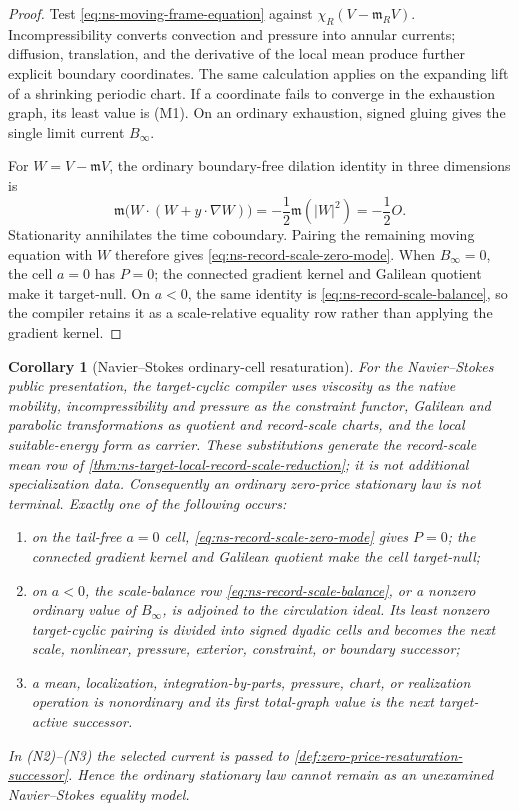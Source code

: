 \documentclass[11pt]{article}
\numberwithin{section}{part}
\theoremstyle{plain}
\newtheorem{corollary}[corollary]{Corollary}
\theoremstyle{definition}
\theoremstyle{remark}
\begin{document}
\begin{proof}
Test \eqref{eq:ns-moving-frame-equation} against
\(\chi_R(V-\mathfrak m_RV)\).  Incompressibility converts convection and
pressure into annular currents; diffusion, translation, and the derivative
of the local mean produce further explicit boundary coordinates.  The same
calculation applies on the expanding lift of a shrinking periodic chart.
If a coordinate fails to converge in the exhaustion graph, its least value
is \textup{(M1)}.  On an ordinary exhaustion, signed gluing gives the single
limit current \(B_\infty\).

For \(W=V-\mathfrak mV\), the ordinary boundary-free dilation identity in
three dimensions is
\[
 \mathfrak m\bigl(W\cdot( W+y\cdot\nabla W)\bigr)
 =-\frac12\mathfrak m(|W|^2)=-\frac12O.
\]
Stationarity annihilates the time coboundary.  Pairing the remaining moving
equation with \(W\) therefore gives
\eqref{eq:ns-record-scale-zero-mode}.  When \(B_\infty=0\), the cell \(a=0\)
has \(P=0\); the connected gradient kernel and Galilean quotient make it
target-null.  On \(a<0\), the same identity is
\eqref{eq:ns-record-scale-balance}, so the compiler retains it as a
scale-relative equality row rather than applying the gradient kernel.
\end{proof}

\begin{corollary}[Navier--Stokes ordinary-cell resaturation]
\label{cor:ns-ordinary-cell-resaturation}
For the Navier--Stokes public presentation, the target-cyclic compiler uses
viscosity as the native mobility, incompressibility and pressure as the
constraint functor, Galilean and parabolic transformations as quotient and
record-scale charts, and the local suitable-energy form as carrier.  These
substitutions generate the record-scale mean row of
\cref{thm:ns-target-local-record-scale-reduction}; it is not additional
specialization data.  Consequently an ordinary zero-price stationary law is
not terminal.  Exactly one of the following occurs:
\begin{enumerate}[label=\textup{(N\arabic*)}]
\item on the tail-free \(a=0\) cell, \eqref{eq:ns-record-scale-zero-mode}
gives \(P=0\); the connected gradient kernel and Galilean quotient make the
cell target-null;
\item on \(a<0\), the scale-balance row
\eqref{eq:ns-record-scale-balance}, or a nonzero ordinary value of
\(B_\infty\), is adjoined to the circulation ideal.  Its least nonzero
target-cyclic pairing is divided into signed dyadic cells and becomes the
next scale, nonlinear, pressure, exterior, constraint, or boundary
successor;
\item a mean, localization, integration-by-parts, pressure, chart, or
realization operation is nonordinary and its first total-graph value is the
next target-active successor.
\end{enumerate}
In \textup{(N2)}--\textup{(N3)} the selected current is passed to
\cref{def:zero-price-resaturation-successor}.  Hence the ordinary stationary
law cannot remain as an unexamined Navier--Stokes equality model.
\end{corollary}
\end{document}
